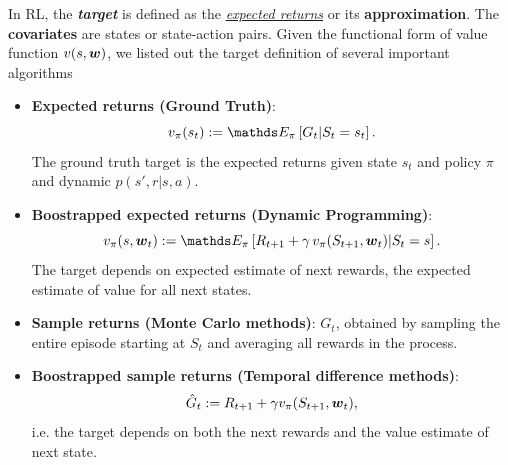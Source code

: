 \documentclass[11pt]{article}
\begin{document}
In RL, the \emph{\textbf{target}} is defined as the \emph{\underline{expected returns}} or its \textbf{approximation}. The \textbf{covariates} are states or state-action pairs. Given the functional form of value function $v(s, \boldsymbol{w})$, we listed out the target definition of several important algorithms 
\begin{itemize}
\item \textbf{Expected returns (Ground Truth)}: $$v_{\pi}(s_{t}):= \E{\pi}{G_{t} | S_{t} = s_{t}}.$$ The ground truth target is the expected returns given state $s_{t}$ and policy $\pi$ and dynamic $p(s', r| s, a)$.  

\item \textbf{Boostrapped expected returns (Dynamic Programming)}: $$v_{\pi}(s, \mb{w}_{t}) :=  \E{\pi}{R_{t+1}  + \gamma\,v_{\pi}(S_{t+1}, \mb{w}_{t}) | S_{t} = s}.$$ The target depends on expected estimate of next rewards, the expected estimate of value for all next states. 


\item \textbf{Sample returns (Monte Carlo methods)}: $G_{t}$, obtained by sampling the entire episode starting at $S_{t}$ and averaging all rewards in the process.

\item \textbf{Boostrapped sample returns (Temporal difference methods)}: $$\hat{G}_{t} := R_{t+1} + \gamma v_{\pi}(S_{t+1}, \boldsymbol{w}_{t}),$$ i.e. the target depends on both the next rewards and the value estimate of next state.
\end{itemize}
\end{document}
